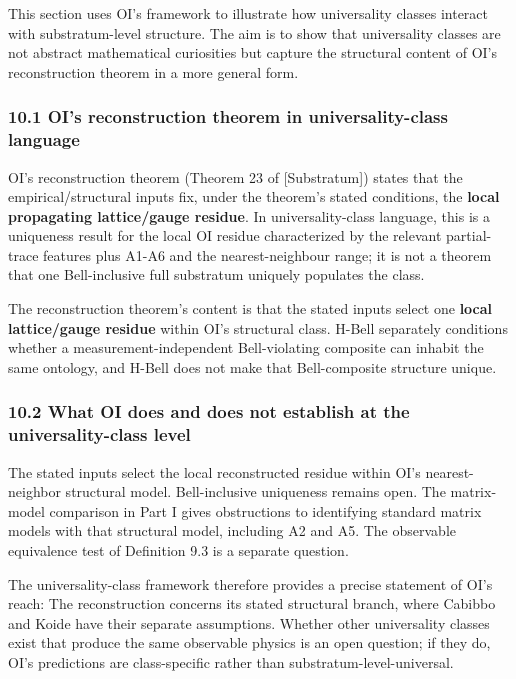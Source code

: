 \documentclass[
]{article}
\begin{document}
This section uses OI's framework to illustrate how universality classes
interact with substratum-level structure. The aim is to show that
universality classes are not abstract mathematical curiosities but
capture the structural content of OI's reconstruction theorem in a more
general form.

\hypertarget{ois-reconstruction-theorem-in-universality-class-language}{%
\subsubsection{10.1 OI's reconstruction theorem in universality-class
language}\label{ois-reconstruction-theorem-in-universality-class-language}}

OI's reconstruction theorem (Theorem 23 of {[}Substratum{]}) states that
the empirical/structural inputs fix, under the theorem's stated
conditions, the \textbf{local propagating lattice/gauge residue}. In
universality-class language, this is a uniqueness result for the local
OI residue characterized by the relevant partial-trace features plus
A1-A6 and the nearest-neighbour range; it is not a theorem that one
Bell-inclusive full substratum uniquely populates the class.

The reconstruction theorem's content is that the stated inputs select
one \textbf{local lattice/gauge residue} within OI's structural class.
H-Bell separately conditions whether a measurement-independent
Bell-violating composite can inhabit the same ontology, and H-Bell does
not make that Bell-composite structure unique.

\hypertarget{what-oi-does-and-does-not-establish-at-the-universality-class-level}{%
\subsubsection{10.2 What OI does and does not establish at the
universality-class
level}\label{what-oi-does-and-does-not-establish-at-the-universality-class-level}}

The stated inputs select the local reconstructed residue within OI's
nearest-neighbor structural model. Bell-inclusive uniqueness remains
open. The matrix-model comparison in Part I gives obstructions to
identifying standard matrix models with that structural model, including
A2 and A5. The observable equivalence test of Definition 9.3 is a
separate question.

The universality-class framework therefore provides a precise statement
of OI's reach: The reconstruction concerns its stated structural branch,
where Cabibbo and Koide have their separate assumptions. Whether other
universality classes exist that produce the same observable physics is
an open question; if they do, OI's predictions are class-specific rather
than substratum-level-universal.
\end{document}
